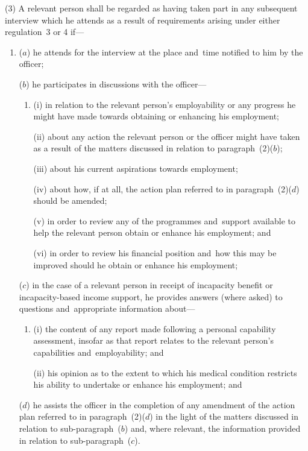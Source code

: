 \documentclass[12pt,a4paper]{article}
\begin{document}
(3) A relevant person shall be regarded as having taken part in any subsequent interview which he attends as a result of requirements arising under either regulation~3 or 4 if—
\begin{enumerate}\item[]
($a$) he attends for the interview at the place and~time notified to him by the officer;

($b$) he participates in discussions with the officer—
\begin{enumerate}\item[]
(i) in relation to the relevant person’s employability or any progress he might have made towards obtaining or enhancing his employment;

(ii) about any action the relevant person or the officer might have taken as a result of the matters discussed in relation to paragraph~(2)($b$);

(iii) about his current aspirations towards employment;

(iv) about how, if at all, the action plan referred to in paragraph~(2)($d$)  should be amended;

(v) in order to review any of the programmes and~support available to help the relevant person obtain or enhance his employment; and

(vi) in order to review his financial position and~how this may be improved should he obtain or enhance his employment;
\end{enumerate}

($c$) in the case of a relevant person in receipt of incapacity benefit or incapacity-based income support, he provides answers (where asked) to questions and~appropriate information about—
\begin{enumerate}\item[]
(i) the content of any report made following a personal capability assessment, insofar as that report relates to the relevant person’s capabilities and~employability; and

(ii) his opinion as to the extent to which his medical condition restricts his ability to undertake or enhance his employment; and
\end{enumerate}

($d$) he assists the officer in the completion of any amendment of the action plan referred to in paragraph~(2)($d$)  in the light of the matters discussed in relation to sub-paragraph~($b$)  and, where relevant, the information provided in relation to sub-paragraph~($c$).
\end{enumerate}
\end{document}

